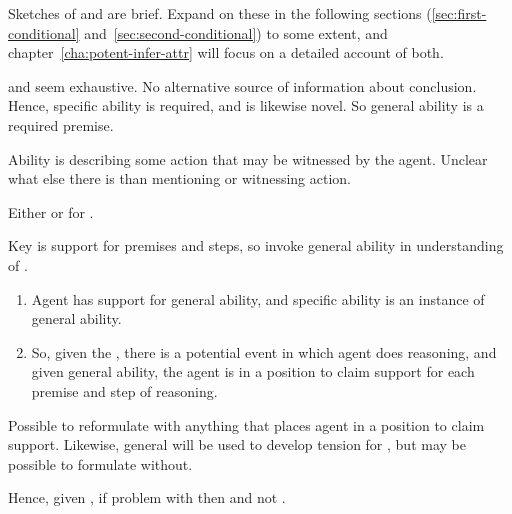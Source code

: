\begin{note}
  Sketches of \AR{} and \WR{} are brief.
  Expand on these in the following sections (\ref{sec:first-conditional} and~\ref{sec:second-conditional}) to some extent, and chapter~\ref{cha:potent-infer-attr} will focus on a detailed account of both.
\end{note}

\begin{note}
  \AR{} and \WR{} seem exhaustive.
  No alternative source of information about conclusion.
  Hence, specific ability is required, and is likewise novel.
  So general ability is a required premise.

  Ability is describing some action that may be witnessed by the agent.
  Unclear what else there is than mentioning or witnessing action.

  \begin{proposition}\label{either-AR-or-WR}
    Either \WR{} or \AR{} for \aben{}.
  \end{proposition}
\end{note}

\begin{note}[\WR{} alternative]
  Key is support for premises and steps, so invoke general ability in understanding of \WR{}.

  \begin{enumerate}
  \item Agent has support for general ability, and specific ability is an instance of general ability.
  \item So, given the \GSI{}, there is a potential event in which agent does reasoning, and given general ability, the agent is in a position to claim support for each premise and step of reasoning.
  \end{enumerate}

  Possible to reformulate with anything that places agent in a position to claim support.
  Likewise, general will be used to develop tension for \AR{}, but may be possible to formulate without.

  Hence, given \label{either-AR-or-WR}, if problem with \AR{} then \WR{} and not \uRa{}.
\end{note}

